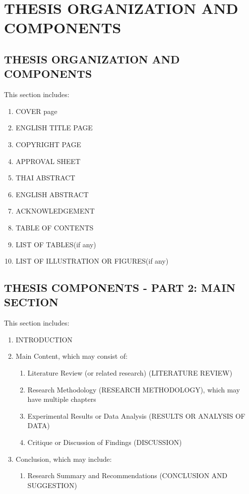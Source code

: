 \chapter{THESIS ORGANIZATION AND COMPONENTS}

\section{THESIS ORGANIZATION AND COMPONENTS}

This section includes:
\begin{enumerate}
    \item COVER page
    \item ENGLISH TITLE PAGE
    \item COPYRIGHT PAGE
    \item APPROVAL SHEET
    \item THAI ABSTRACT
    \item ENGLISH ABSTRACT
    \item ACKNOWLEDGEMENT
    \item TABLE OF CONTENTS
    \item LIST OF TABLES(if any)
    \item LIST OF ILLUSTRATION OR FIGURES(if any)
\end{enumerate}

\section{THESIS COMPONENTS - PART 2: MAIN SECTION}

This section includes:
\begin{enumerate}
    \item INTRODUCTION
    \item Main Content, which may consist of:
    \begin{enumerate}
        \item Literature Review (or related research) (LITERATURE REVIEW)
        \item Research Methodology (RESEARCH METHODOLOGY), which may have multiple chapters
        \item Experimental Results or Data Analysis (RESULTS OR ANALYSIS OF DATA)
        \item Critique or Discussion of Findings (DISCUSSION)
    \end{enumerate}
    \item Conclusion, which may include:
    \begin{enumerate}
        \item Research Summary and Recommendations (CONCLUSION AND SUGGESTION)
    \end{enumerate}
\end{enumerate}